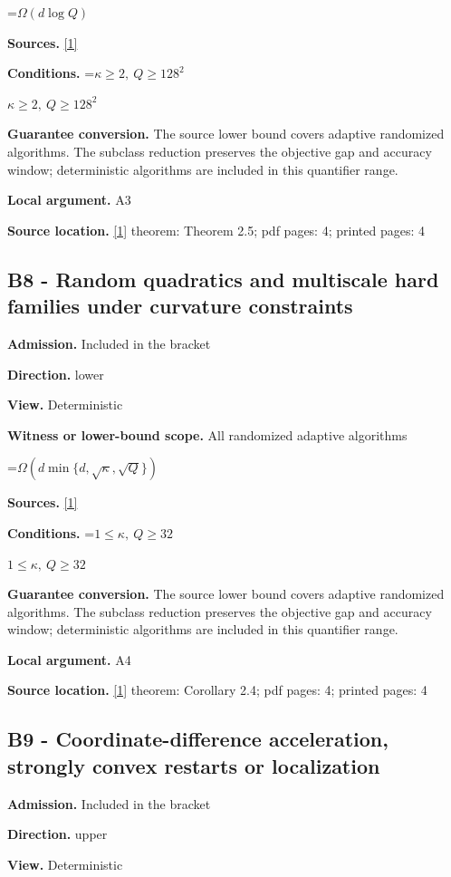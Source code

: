 \documentclass[10pt,a4paper]{article}
\newcommand{\AtlasMath}[1]{\par\begingroup\centering\setbox0=\hbox{$\displaystyle #1$}\ifdim\wd0>1.4\linewidth\typeout{ATLAS WIDE FORMULA: \the\wd0}\fi\ifdim\wd0>\linewidth\resizebox{\linewidth}{!}{\box0}\else\box0\fi\par\endgroup}
\newcommand{\AtlasInlineMath}[1]{\begingroup\setbox0=\hbox{$#1$}\ifdim\wd0>.4\linewidth\endgroup\AtlasMath{#1}\else\endgroup$#1$\fi}
\begin{document}
\AtlasMath{\Omega(d\log Q)}
\textbf{Sources.} \href{https://arxiv.org/html/2610.00345v1}{[1]}

\textbf{Conditions.} \AtlasInlineMath{\kappa\ge2,\ Q\ge128^2}

\textbf{Guarantee conversion.} The source lower bound covers adaptive randomized algorithms. The subclass reduction preserves the objective gap and accuracy window; deterministic algorithms are included in this quantifier range.

\textbf{Local argument.} A3

\textbf{Source location.} \href{https://arxiv.org/html/2610.00345v1}{[1]} theorem: Theorem 2.5; pdf pages: 4; printed pages: 4

\subsection{B8 - Random quadratics and multiscale hard families under curvature constraints}
\textbf{Admission.} Included in the bracket

\textbf{Direction.} lower

\textbf{View.} Deterministic

\textbf{Witness or lower-bound scope.} All randomized adaptive algorithms

\AtlasMath{\Omega(d\min\{d,\sqrt\kappa,\sqrt Q\})}
\textbf{Sources.} \href{https://arxiv.org/html/2610.00345v1}{[1]}

\textbf{Conditions.} \AtlasInlineMath{1\le\kappa,\ Q\ge32}

\textbf{Guarantee conversion.} The source lower bound covers adaptive randomized algorithms. The subclass reduction preserves the objective gap and accuracy window; deterministic algorithms are included in this quantifier range.

\textbf{Local argument.} A4

\textbf{Source location.} \href{https://arxiv.org/html/2610.00345v1}{[1]} theorem: Corollary 2.4; pdf pages: 4; printed pages: 4

\subsection{B9 - Coordinate-difference acceleration, strongly convex restarts or localization}
\textbf{Admission.} Included in the bracket

\textbf{Direction.} upper

\textbf{View.} Deterministic
\end{document}
